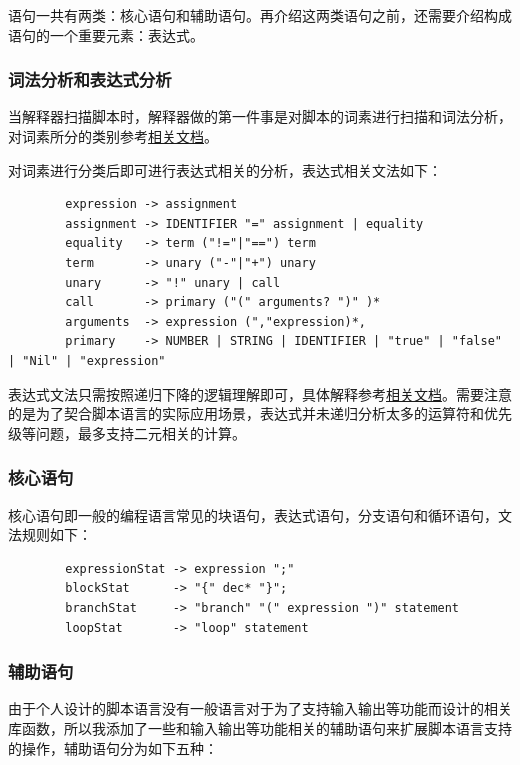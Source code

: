 \documentclass[12pt]{article}
\begin{document}
    语句一共有两类：核心语句和辅助语句。再介绍这两类语句之前，还需要介绍构成语句的一个重要元素：表达式。

    \subsubsection{词法分析和表达式分析}

    当解释器扫描脚本时，解释器做的第一件事是对脚本的词素进行扫描和词法分析，对词素所分的类别参考\href{generate_by_cargo/robot_dsl/token/enum.TokenType.html}{相关文档}。

    对词素进行分类后即可进行表达式相关的分析，表达式相关文法如下：

    \begin{verbatim}
        expression -> assignment
        assignment -> IDENTIFIER "=" assignment | equality
        equality   -> term ("!="|"==") term
        term       -> unary ("-"|"+") unary
        unary      -> "!" unary | call
        call       -> primary ("(" arguments? ")" )*
        arguments  -> expression (","expression)*,
        primary    -> NUMBER | STRING | IDENTIFIER | "true" | "false" | "Nil" | "expression"   
    \end{verbatim}

    表达式文法只需按照递归下降的逻辑理解即可，具体解释参考\href{generate_by_cargo/robot_dsl/syntax/enum.Expr.html}{相关文档}。需要注意的是为了契合脚本语言的实际应用场景，表达式并未递归分析太多的运算符和优先级等问题，最多支持二元相关的计算。

    \subsubsection{核心语句}

    核心语句即一般的编程语言常见的块语句，表达式语句，分支语句和循环语句，文法规则如下：

    \begin{verbatim}
        expressionStat -> expression ";"
        blockStat      -> "{" dec* "}";
        branchStat     -> "branch" "(" expression ")" statement
        loopStat       -> "loop" statement
    \end{verbatim}

    \subsubsection{辅助语句}

    由于个人设计的脚本语言没有一般语言对于为了支持输入输出等功能而设计的相关库函数，所以我添加了一些和输入输出等功能相关的辅助语句来扩展脚本语言支持的操作，辅助语句分为如下五种：
\end{document}
